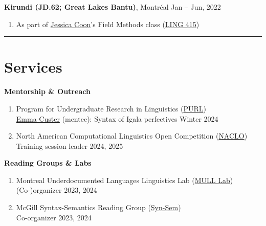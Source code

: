 \documentclass[margin,line]{resume}
\begin{document}
\begin{resume}
		\textbf{Kirundi (JD.62; Great Lakes Bantu)}, Montr\'{e}al \hfill Jan -- Jun, 2022
		\begin{enumerate}[-, leftmargin=1em, topsep=2pt]
			\item[] As part of \href{https://jessica.lingspace.org/}{Jessica Coon}'s Field Methods class (\href{https://www.mcgill.ca/study/2021-2022/courses/ling-415}{LING 415})
		\end{enumerate}
	
		\vspace{-0.9em}\rule{\textwidth}{0.4pt}


	\vspace{-0.5em}

	\section{\mysidestyle Services}


	\textbf{Mentorship \& Outreach}
	\begin{enumerate}[-, leftmargin=1em, topsep=2pt]
		\item[] 
			Program for Undergraduate Research in Linguistics (\href{https://www.mcgill.ca/cogsci/research/cogs396}{PURL})\\
		      \hphantom{...}\href{https://www.linkedin.com/in/emma-custer-648345252}{Emma Custer} (mentee): Syntax of Igala perfectives \hfill Winter 2024

		\item[] North American Computational Linguistics Open Competition (\href{https://naclo.org/}{NACLO})\\
		      \hphantom{...}Training session leader \hfill 2024, 2025
	\end{enumerate}

	\textbf{Reading Groups \& Labs}
	\begin{enumerate}[-, leftmargin=1em, topsep=2pt]
		\item[] Montreal Underdocumented Languages Linguistics Lab (\href{https://mcling.blogs.mcgill.ca/category/mull-lab/}{MULL Lab})\\
		      \hphantom{...}(Co-)organizer \hfill 2023, 2024

		\item[] McGill Syntax-Semantics Reading Group (\href{https://mcling.blogs.mcgill.ca/category/syntax-semantics-group/}{Syn-Sem})\\
		      \hphantom{...}Co-organizer \hfill 2023, 2024
	\end{enumerate}


\end{resume}
\end{document}
